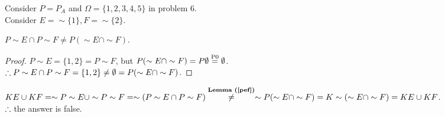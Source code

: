 \begin{pr}
Consider $P=P_A$ and $\Omega=\{1, 2, 3, 4, 5\}$ in problem 6.\\
Consider $E=\sim\{1\}, F=\sim\{2\}$.
\begin{lm}\label{pef}
$P\sim E\cap P\sim F\neq P(\sim E\cap\sim F)$.
\begin{proof}
$P\sim E=\{1, 2\}=P\sim F$, but $P(\sim E\cap\sim F)=P\emptyset\overset{\text{P0}}=\emptyset$.\\
$\therefore P\sim E\cap P\sim F=\{1, 2\}\neq\emptyset=P(\sim E\cap\sim F)$.
\end{proof}
\end{lm}
$KE\cup KF=\sim P\sim E\cup\sim P\sim F=\sim(P\sim E\cap P\sim F)\overtext{\rflm{pef}}\neq\sim P(\sim E\cap\sim F)=K\sim(\sim E\cap\sim F)=KE\cup KF$.\\
$\therefore$ the answer is false.
\end{pr}
